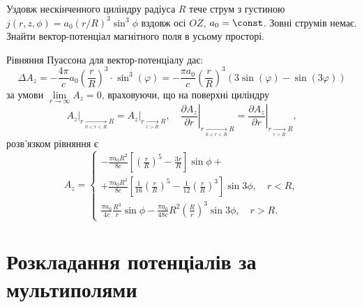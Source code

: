\begin{problem}
Уздовж нескінченного циліндру радіуса $R$ тече струм з густиною $j(r,z,\phi) = a_0(r/R)^3 \sin^3\phi$ вздовж осі $OZ$, $a_0 = \const$. Зовні струмів немає. Знайти вектор-потенціал магнітного поля в усьому просторі.
\begin{solution}
	Рівняння Пуассона для вектор-потенціалу дає:
	\[\Delta {A_z} =  - \frac{{4\pi }}{c}{a_0}{\left( {\frac{r}{R}} \right)^3} \cdot {\sin ^3}(\varphi ) =  - \frac{{\pi {a_0}}}{c}{\left( {\frac{r}{R}} \right)^3}\left( {3\sin (\varphi ) - \sin (3\varphi )} \right)
	\]
    за умови $\lim\limits_{r\to\infty} A_z = 0$, враховуючи, що на поверхні циліндру 
    \[
        \left. A_z\right|_{r \underset{0<r<R}{\to} R} = \left. A_z\right|_{r \underset{r>R}{\to} R}, \quad  \left. \frac{\partial A_z}{\partial r}\right|_{r \underset{0<r<R}{\to} R} = \left. \frac{\partial A_z}{\partial r}\right|_{r \underset{r>R}{\to} R},
    \]    
розв'язком рівняння є
	\[
		A_z =
		\begin{cases}
			- \frac{\pi a_0R^2}{8c}\left[ \left( \frac{r}{R} \right)^5 - \frac{3r}{R} \right] \sin\phi  + \\ +  \frac{\pi a_0R^2}{8c}\left[ \frac{1}{16}{\left( \frac{r}{R} \right)^5} - \frac{1}{12} \left( \frac{r}{R} \right)^3 \right]  \sin3\phi, \quad r < R, \\
			\frac{\pi a_0}{4c}\frac{R^3}{r} \sin\phi  - \frac{{\pi {a_0}}}{{48c}}{R^2}{\left( {\frac{R}{r}} \right)^3}  \sin3\phi, \quad r > R.
		\end{cases}
	\]
\end{solution}
\end{problem}

\section{Розкладання потенціалів за мультиполями}

